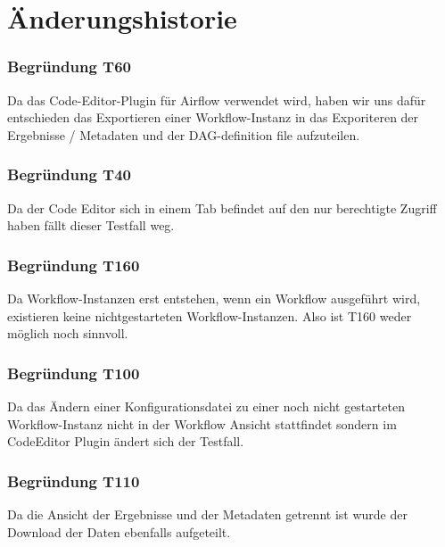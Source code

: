 \chapter{Änderungshistorie}

\subsection{Begründung T60}\label{begT60}
Da das Code-Editor-Plugin für Airflow verwendet wird, haben wir uns dafür entschieden das Exportieren einer Workflow-Instanz in das Exporiteren der Ergebnisse / Metadaten und der DAG-definition file aufzuteilen.


\subsection{Begründung T40}\label{begT40}
Da der Code Editor sich in einem Tab befindet auf den nur berechtigte Zugriff haben fällt dieser Testfall weg.

\subsection{Begründung T160}\label{begT160}
Da Workflow-Instanzen erst entstehen, wenn ein Workflow ausgeführt wird, existieren keine nichtgestarteten Workflow-Instanzen. Also ist T160 weder möglich noch sinnvoll. 













\subsection{Begründung T100}\label{begT100}
Da das Ändern einer Konfigurationsdatei zu einer noch nicht gestarteten Workflow-Instanz nicht in der Workflow Ansicht stattfindet sondern im CodeEditor Plugin ändert sich der Testfall. 

\subsection{Begründung T110}\label{begT110}
Da die Ansicht der Ergebnisse und der Metadaten getrennt ist wurde der Download der Daten ebenfalls aufgeteilt.